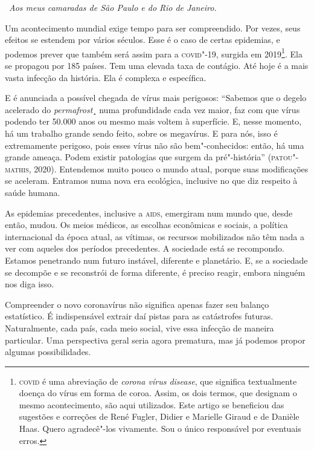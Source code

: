 

\hfill\ \emph{Aos meus camaradas de São Paulo e do Rio de Janeiro.}\bigskip

\noindent{}Um acontecimento mundial exige tempo para ser compreendido. Por vezes,
seus efeitos se estendem por vários séculos. Esse é o caso de certas
epidemias, e podemos prever que também será assim para a \textsc{covid}"-19,
surgida em 2019\footnote{\textsc{covid} é uma abreviação de \emph{corona vírus
  disease}, que significa textualmente doença do vírus em forma de
  coroa. Assim, os dois termos, que designam o mesmo acontecimento, são
  aqui utilizados. Este artigo se beneficiou das sugestões e correções
  de René Fugler, Didier e Marielle Giraud e de Danièle Haas. Quero
  agradecê"-los vivamente. Sou o único responsável por eventuais erros.}.
Ela se propagou por 185 países. Tem uma elevada taxa de contágio. Até
hoje é a mais vasta infecção da história. Ela é complexa e específica.

E é anunciada a possível chegada de vírus mais perigosos: ``Sabemos que
o degelo acelerado do \emph{permafrost}¸ numa profundidade cada vez
maior, faz com que vírus podendo ter 50.000 anos ou mesmo mais voltem à
superfície. E, nesse momento, há um trabalho grande sendo feito, sobre
os megavírus. E para nós, isso é extremamente perigoso, pois esses vírus
não são bem"-conhecidos: então, há uma grande ameaça. Podem existir
patologias que surgem da pré"-história'' (\textsc{patou"-mathis}, 2020). Entendemos
muito pouco o mundo atual, porque suas modificações se aceleram.
Entramos numa nova era ecológica, inclusive no que diz respeito à saúde
humana.

As epidemias precedentes, inclusive a \textsc{aids}, emergiram num mundo que,
desde então, mudou. Os meios médicos, as escolhas econômicas e sociais,
a política internacional da época atual, as vítimas, os recursos
mobilizados não têm nada a ver com aqueles dos períodos precedentes. A
sociedade está se recompondo. Estamos penetrando num futuro instável,
diferente e planetário. E, se a sociedade se decompõe e se reconstrói de
forma diferente, é preciso reagir, embora ninguém nos diga isso.

Compreender o novo coronavírus não significa apenas fazer seu balanço
estatístico. É indispensável extrair daí pistas para as catástrofes
futuras. Naturalmente, cada país, cada meio social, vive essa infecção
de maneira particular. Uma perspectiva geral seria agora prematura, mas
já podemos propor algumas possibilidades.

